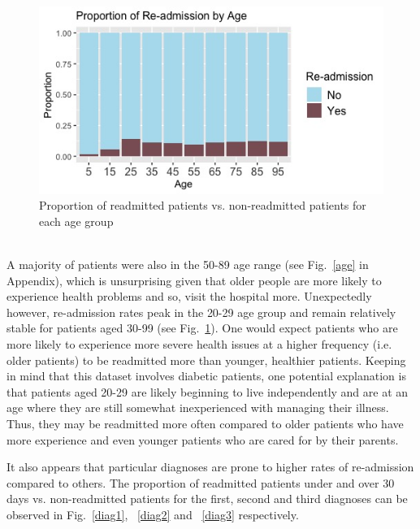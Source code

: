 \documentclass[letterpaper, 10 pt, conference]{ieeeconf}  %
\begin{document}
\begin{figure}[!hbt]
\centering
\includegraphics[width=1\columnwidth]{Rplot.png}
\caption{Proportion of readmitted patients vs. non-readmitted patients for each age group}
\label{ageprop}
\end{figure}\\

A majority of patients were also in the 50-89 age range (see Fig.~\ref{age} in Appendix), which is unsurprising given that older people are more likely to experience health problems and so, visit the hospital more. Unexpectedly however, re-admission rates peak in the 20-29 age group and remain relatively stable for patients aged 30-99 (see Fig.~\ref{ageprop}). One would expect patients who are more likely to experience more severe health issues at a higher frequency (i.e. older patients) to be readmitted more than younger, healthier patients. Keeping in mind that this dataset involves diabetic patients, one potential explanation is that patients aged 20-29 are likely beginning to live independently and are at an age where they are still somewhat inexperienced with managing their illness. Thus, they may be readmitted more often compared to older patients who have more experience and even younger patients who are cared for by their parents.  

It also appears that particular diagnoses are prone to higher rates of re-admission compared to others. The proportion of readmitted patients under and over 30 days vs. non-readmitted patients for the first, second and third diagnoses can be observed in Fig.~\ref{diag1}, ~\ref{diag2} and ~\ref{diag3} respectively. 
\end{document}

